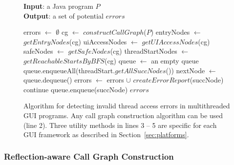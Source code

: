 \begin{figure}[t]
\textbf{Input}: a Java program $P$\\
\textbf{Output}: a set of potential $errors$\\
\vspace{-5mm}
\begin{algorithmic}[1]
\STATE errors $\leftarrow$ $\emptyset$
\STATE cg $\leftarrow$ $constructCallGraph$($P$)
\STATE entryNodes $\leftarrow$ $getEntryNodes$(cg)
\STATE uiAccessNodes $\leftarrow$ $getUIAccessNodes$(cg)
\STATE safeNodes $\leftarrow$ $getSafeNodes$(cg)
\STATE threadStartNodes $\leftarrow$ $getReachableStartsByBFS$(cg)
\STATE queue $\leftarrow$ an empty queue
\STATE queue.enqueueAll(threadStart.$getAllSuccNodes$())
\STATE nextNode $\leftarrow$ queue.dequeue()
\STATE errors $\leftarrow$ errors $\cup$ $createErrorReport$(succNode)
\STATE continue
\ELSE
\STATE queue.enqueue(succNode)
\ENDIF 
\ENDFOR
\ENDWHILE
\ENDFOR
\ENDFOR
\RETURN $errors$
\vspace{-2mm}
\end{algorithmic}
\caption{Algorithm for detecting invalid thread access errors in multithreaded GUI programs. 
Any call graph construction algorithm can be used (line 2).
Three utility methods in lines 3 -- 5 are specific for each GUI framework
 as described in Section~\ref{sec:platforms}.
} \label{fig:detectalgorithm}
\end{figure}


\subsubsection{Reflection-aware Call Graph Construction}
\label{sec:cg}

% 

